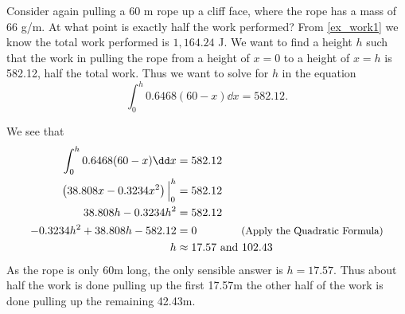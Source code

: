 \begin{example}\label{ex_work1_5}
Consider again pulling a 60 m rope up a cliff face, where the rope has a mass of 66 g/m. At what point is exactly half the work performed?
\solution
From \autoref{ex_work1} we know the total work performed is $1,164.24$ J. We want to find a height $h$ such that the work in pulling the rope from a height of $x=0$ to a height of $x=h$ is 582.12, half the total work. Thus we want to solve for $h$ in the equation
\[\int_0^h 0.6468(60-x)\dd x = 582.12.\]

We see that
\begin{align*}
	\int_0^h 0.6468(60-x)\dd x &= 582.12 \\
	\left(38.808x-0.3234x^2\right)\Big|_0^h &=582.12 \\
	38.808h-0.3234h^2 &=582.12 \\
	-0.3234h^2+38.808h-582.12 &=0 \qquad\qquad\text{\small(Apply the Quadratic Formula)} \\
	h&\approx17.57 \ \text{and}\ 102.43
\end{align*}
As the rope is only 60m long, the only sensible answer is $h=17.57$. Thus about half the work is done pulling up the first 17.57m the other half of the work is done pulling up the remaining 42.43m.
\end{example}

